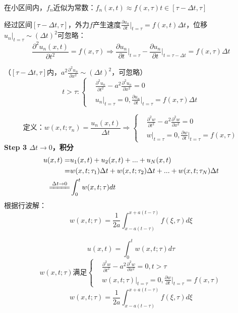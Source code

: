 \begin{ex}
在小区间内，$f_n$近似为常数：$f_n(x,t)\approx f(x,\tau) t\in[\tau-\Delta t,\tau]$

经过区间$[\tau-\Delta t,\tau]$，外力$f$产生速度$\frac{\partial u_n}{\partial t}\bigg|_{t=\tau}=f(x,t)\Delta t$，位移$u_n|_{t=\tau}\sim(\Delta t)^2$可忽略：
  $$\frac{\partial^2{u_n(x,t)}}{\partial{t}^2}=f(x,\tau)\Rightarrow\frac{\partial u_n}{\partial t}\bigg|_{t=\tau}-\frac{\partial u_n}{\partial t}\bigg|_{t=\tau-\Delta t}=f(x,\tau)\Delta t$$
  
  （$[\tau-\Delta t,\tau]$内，$a^2\frac{\partial^2{u_n}}{\partial{x}^2}\sim(\Delta t)^2$，可忽略）
$$t>\tau:\left\{
        \begin{aligned}
                &\frac{\partial^2{u_n}}{\partial{t}^2}-a^2\frac{\partial^2{u_n}}{\partial{x}^2}=0\\
                &u_n|_{t=\tau}=0,\frac{\partial u_n}{\partial t}\bigg|_{t=\tau}=f(x,\tau)\Delta t
        \end{aligned}
\right.$$

$$\text{定义：}w(x,t;\tau_n)=\frac{u_n(x,t)}{\Delta t}\Rightarrow
\left\{
        \begin{aligned}
                &\frac{\partial^2{w}}{\partial{t}^2}-a^2\frac{\partial^2{w}}{\partial{x}^2}=0\\
                &w|_{t=\tau}=0,\frac{\partial w}{\partial t}\bigg|_{t=\tau}=f(x,\tau)
        \end{aligned}
\right.$$
\noindent\textbf{Step 3 $\Delta t\rightarrow0$，积分} 
$$\begin{aligned}
u(x,t)=&u_1(x,t)+u_2(x,t)+...+u_N(x,t)\\
=&w(x,t;\tau_1)\Delta t+w(x,t;\tau_2)\Delta t+...+w(x,t;\tau_N)\Delta t\\
\xlongequal{\Delta t\rightarrow0}&\int_0^t{w(x,t;\tau)dt}
\end{aligned}$$
根据行波解：$$w(x,t;\tau)=\frac{1}{2a}\int^{x+a(t-\tau)}_{x-a(t-\tau)}f(\xi,\tau)d\xi$$
\end{ex}

\begin{mtd}
$$u(x,t)=\int^t_0{w(x,t;\tau)d\tau}$$
$$w(x,t;\tau)\text{满足}\left\{
        \begin{aligned}
                &\frac{\partial^2{w}}{\partial{t}^2}-a^2\frac{\partial^2{w}}{\partial{x}^2}=0,t>\tau\\
                &w(x,t;\tau)|_{t=\tau}=0,\frac{\partial w}{\partial t}\bigg|_{t=\tau}=f(x,\tau)
        \end{aligned}
\right.$$
$$w(x,t;\tau)=\frac{1}{2a}\int^{x+a(t-\tau)}_{x-a(t-\tau)}f(\xi,\tau)d\xi$$
\end{mtd}

